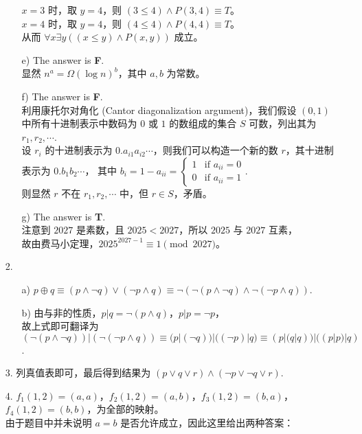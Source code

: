 \documentclass{ctexbook}
\begin{document}
\begin{enumerate}
\begin{enumerate}
        $x=3$ 时，取 $y=4$，则 $(3\leq 4)\land P(3,4)\equiv T$。\\
        $x=4$ 时，取 $y=4$，则 $(4\leq 4)\land P(4,4)\equiv T$。\\
        从而 $\forall x\exists y((x\leq y)\land P(x,y))$ 成立。
        \item [e)] The answer is \textbf{F}. \\
        显然 $n^a=\Omega(\log n)^b$，其中 $a, b$ 为常数。
        \item [f)] The answer is \textbf{F}. \\
        利用康托尔对角化 (Cantor diagonalization argument)，我们假设 $(0,1)$ 中所有十进制表示中数码为 $0$ 或 $1$ 的数组成的集合 $S$ 可数，列出其为 $r_1,r_2,\cdots$.\\
        设 $r_i$ 的十进制表示为 $0.a_{i1}a_{i2}\cdots$，则我们可以构造一个新的数 $r$，其十进制表示为 $0.b_1b_2\cdots$，
        其中 $b_i=1-a_{ii}=\begin{cases}
            1 & \text{if } a_{ii}=0 \\
            0 & \text{if } a_{ii}=1
        \end{cases}$.\\
        则显然 $r$ 不在 $r_1,r_2,\cdots$ 中，但 $r\in S$，矛盾。
        \item [g)] The answer is \textbf{T}. \\
        注意到 $2027$ 是素数，且 $2025<2027$，所以 $2025$ 与 $2027$ 互素，\\
        故由费马小定理，$2025^{2027-1}\equiv 1\pmod{2027}$。
    \end{enumerate}
    \item[2.] \begin{enumerate}
        \item[a)] $p\oplus q\equiv(p\land\lnot q)\lor(\lnot p\land q)\equiv\lnot(\lnot(p\land\lnot q)\land\lnot(\lnot p\land q))$.
        \item[b)] 由与非的性质，$p|q=\lnot(p\land q)$，$p|p=\lnot p$，\\
        故上式即可翻译为 $(\lnot(p\land\lnot q))|(\lnot(\lnot p\land q))\equiv (p|(\lnot q))|((\lnot p)|q)\equiv (p|(q|q))|((p|p)|q)$.
    \end{enumerate}
    \item[3.] 列真值表即可，最后得到结果为 $(p\lor q\lor r)\land(\lnot p\lor\lnot q\lor r)$.
    \item[4.] $f_1(1,2)=(a,a)$，$f_2(1,2)=(a,b)$，$f_3(1,2)=(b,a)$，$f_4(1,2)=(b,b)$，为全部的映射。\\
    由于题目中并未说明 $a=b$ 是否允许成立，因此这里给出两种答案：\\

\end{enumerate}
\end{document}
